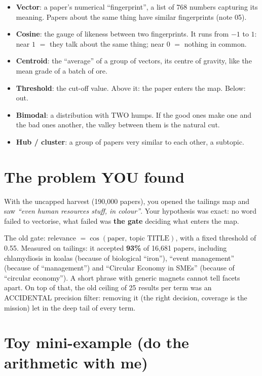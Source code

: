 \documentclass[11pt,a4paper]{article}
\begin{document}
\begin{itemize}
  \item \textbf{Vector}: a paper's numerical ``fingerprint'', a list of 768 numbers capturing
        its meaning. Papers about the same thing have similar fingerprints (note 05).
  \item \textbf{Cosine}: the gauge of likeness between two fingerprints. It runs from $-1$ to
        $1$: near $1$ $=$ they talk about the same thing; near $0$ $=$ nothing in common.
  \item \textbf{Centroid}: the ``average'' of a group of vectors, its centre of gravity, like
        the mean grade of a batch of ore.
  \item \textbf{Threshold}: the cut-off value. Above it: the paper enters the map. Below: out.
  \item \textbf{Bimodal}: a distribution with TWO humps. If the good ones make one and the bad
        ones another, the valley between them is the natural cut.
  \item \textbf{Hub / cluster}: a group of papers very similar to each other, a subtopic.
\end{itemize}

\section{The problem YOU found}

With the uncapped harvest (190,000 papers), you opened the tailings map and saw \emph{``even
human resources stuff, in colour''}. Your hypothesis was exact: no word failed to vectorise,
what failed was \textbf{the gate} deciding what enters the map.

The old gate: relevance $= \cos(\mbox{paper},\ \mbox{topic TITLE})$, with a fixed threshold of
0.55. Measured on tailings: it accepted \textbf{93\%} of 16,681 papers, including chlamydiosis
in koalas (because of biological ``iron''), ``event management'' (because of ``management'')
and ``Circular Economy in SMEs'' (because of ``circular economy''). A short phrase with generic
magnets cannot tell facets apart. On top of that, the old ceiling of 25 results per term was an
ACCIDENTAL precision filter: removing it (the right decision, coverage is the mission) let in
the deep tail of every term.

\section{Toy mini-example (do the arithmetic with me)}
\end{document}
